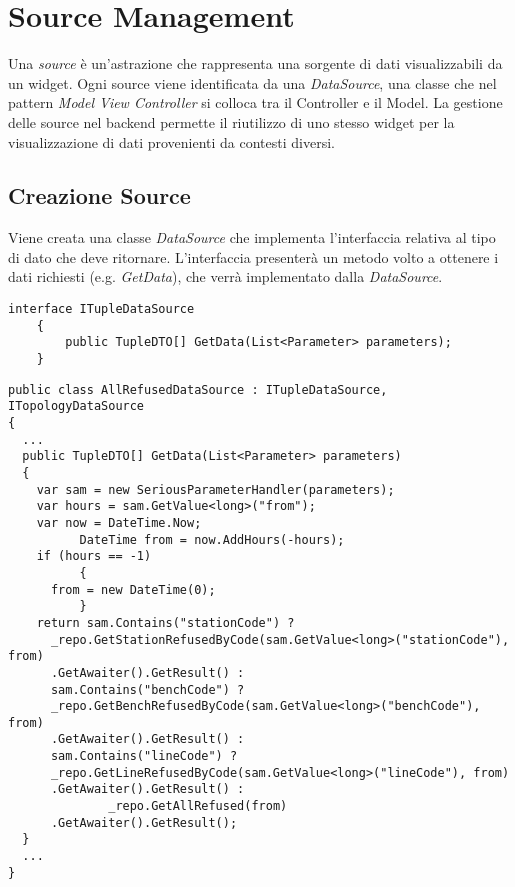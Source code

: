 \section{Source Management}
\label{ch:sms}

Una \textit{source} è un'astrazione che rappresenta una sorgente di dati visualizzabili da un widget. Ogni source viene identificata da una \textit{DataSource}, una classe che nel pattern \textit{Model View Controller} si colloca tra il Controller e il Model. La gestione delle source nel backend permette il riutilizzo di uno stesso widget per la visualizzazione di dati provenienti da contesti diversi.

\subsection{Creazione Source}
\label{subsec:creazioneSource}
Viene creata una classe \textit{DataSource} che implementa l’interfaccia relativa al tipo di dato che deve ritornare. L'interfaccia presenterà un metodo volto a ottenere i dati richiesti (e.g. \textit{GetData}), che verrà implementato dalla \textit{DataSource}.
\begin{lstlisting}[caption={ITupleDataSource.cs}, style=sharpCode]
interface ITupleDataSource
    {
        public TupleDTO[] GetData(List<Parameter> parameters);
    }
\end{lstlisting}
\begin{lstlisting}[caption={TupleDataSource.cs}, style=sharpCode]
public class AllRefusedDataSource : ITupleDataSource, ITopologyDataSource
{
  ...
  public TupleDTO[] GetData(List<Parameter> parameters)
  {
    var sam = new SeriousParameterHandler(parameters);
    var hours = sam.GetValue<long>("from");
    var now = DateTime.Now;
          DateTime from = now.AddHours(-hours);
    if (hours == -1)
          {
      from = new DateTime(0);
          }
    return sam.Contains("stationCode") ? 
      _repo.GetStationRefusedByCode(sam.GetValue<long>("stationCode"), from)
      .GetAwaiter().GetResult() :
      sam.Contains("benchCode") ? 
      _repo.GetBenchRefusedByCode(sam.GetValue<long>("benchCode"), from)
      .GetAwaiter().GetResult() :
      sam.Contains("lineCode") ?
      _repo.GetLineRefusedByCode(sam.GetValue<long>("lineCode"), from)
      .GetAwaiter().GetResult() :
              _repo.GetAllRefused(from)
      .GetAwaiter().GetResult();
  }
  ...
}
\end{lstlisting}

